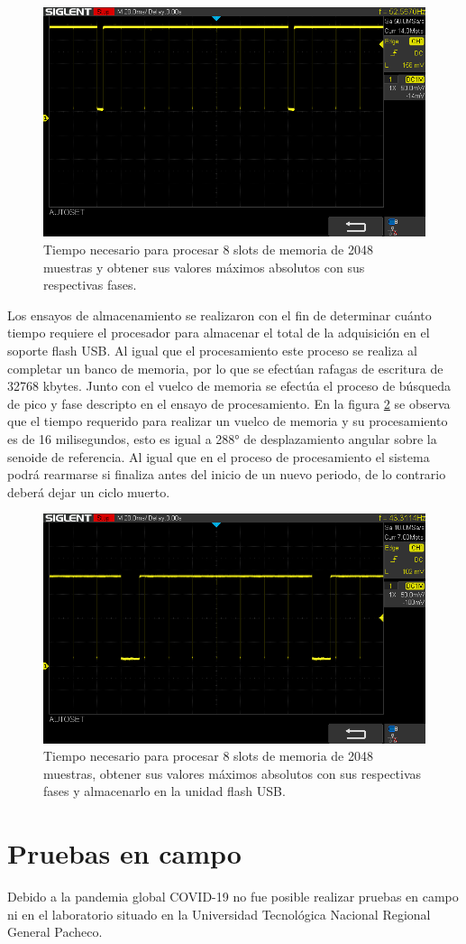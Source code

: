 \begin{figure}[ht]
	\centering
	\includegraphics[width=130mm]{./Figures/tiempoSavePatron.png}
	\caption{Tiempo necesario para procesar 8 slots de memoria de 2048 muestras y obtener sus valores máximos absolutos con sus respectivas fases.}
	\label{fig:tiempoSavePatron}
\end{figure}

Los ensayos de almacenamiento se realizaron con el fin de determinar cuánto tiempo requiere el procesador para almacenar el total de la adquisición en el soporte flash USB. Al igual que el procesamiento este proceso se realiza al completar un banco de memoria, por lo que se efectúan rafagas de escritura de 32768 kbytes. Junto con el vuelco de memoria se efectúa el proceso de búsqueda de pico y fase descripto en el ensayo de procesamiento. En la figura \ref{fig:tiempoSaveAll}  se observa que el tiempo requerido para realizar un vuelco de memoria y su procesamiento es de 16 milisegundos, esto es igual a 288° de desplazamiento angular sobre la senoide de referencia. Al igual que en el proceso de procesamiento el sistema podrá rearmarse si finaliza antes del inicio de un nuevo periodo, de lo contrario deberá dejar un ciclo muerto.

\begin{figure}[ht]
	\centering
	\includegraphics[width=130mm]{./Figures/tiempoSaveAll.png}
	\caption{Tiempo necesario para procesar 8 slots de memoria de 2048 muestras, obtener sus valores máximos absolutos con sus respectivas fases y almacenarlo en la unidad flash USB.}
	\label{fig:tiempoSaveAll}
\end{figure}

\section{Pruebas en campo}
Debido a la pandemia global COVID-19 no fue posible realizar pruebas en campo ni en el laboratorio situado en la Universidad Tecnológica Nacional Regional General Pacheco.